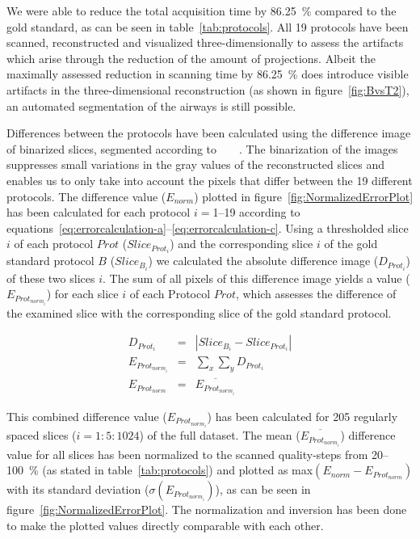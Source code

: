 We were able to reduce the total acquisition time by \SI{86.25}{\percent} compared to the gold standard, as can be seen in table~\ref{tab:protocols}. All 19 protocols have been scanned, reconstructed and visualized three-dimensionally to assess the artifacts which arise through the reduction of the amount of projections. Albeit the maximally assessed reduction in scanning time by \SI{86.25}{\percent} does introduce visible artifacts in the three-dimensional reconstruction (as shown in figure~\ref{fig:BvsT2}), an automated segmentation of the airways is still possible.

Differences between the protocols have been calculated using the difference image of binarized slices, segmented according to%
\ifhtml
	~\citet{Otsu1979}
\else
	~
\fi%
. The binarization of the images suppresses small variations in the gray values of the reconstructed slices and enables us to only take into account the pixels that differ between the 19 different protocols. The difference value ($E_{norm}$) plotted in figure~\ref{fig:NormalizedErrorPlot} has been calculated for each protocol $i=$1--19 according to equations~\ref{eq:errorcalculation-a}--\ref{eq:errorcalculation-c}. Using a thresholded slice $i$ of each protocol $Prot$ ($Slice_{Prot_{i}}$) and the corresponding slice $i$ of the gold standard protocol $B$ ($Slice_{B_{i}}$) we calculated the absolute difference image ($D_{Prot_{i}}$) of these two slices $i$. The sum of all pixels of this difference image yields a value ($E_{Prot_{norm_{i}}}$) for each slice $i$ of each Protocol $Prot$, which assesses the difference of the examined slice with the corresponding slice of the gold standard protocol. 

\begin{eqnarray}%
	D_{Prot_{i}} &=& |Slice_{B_{i}}-Slice_{Prot_{i}}|\label{eq:errorcalculation-a}\\%
	E_{Prot_{norm_{i}}} &=& \sum_{x}\sum_{y} D_{Prot_{i}}\label{eq:errorcalculation-b}\\%
    E_{Prot_{norm}} &=& \overline{E_{Prot_{norm_{i}}}}\label{eq:errorcalculation-c}%
\end{eqnarray}%

This combined difference value ($E_{Prot_{norm_{i}}}$) has been calculated for 205 regularly spaced slices ($i=1:5:1024$) of the full dataset. The mean ($\overline{E_{Prot_{norm_{i}}}}$) difference value for all slices has been normalized to the scanned quality-steps from 20--\SI{100}{\percent} (as stated in table~\ref{tab:protocols}) and plotted as max$(E_{norm}-E_{Prot_{norm}})$ with its standard deviation ($\sigma(E_{Prot_{norm_{i}}})$), as can be seen in figure~\ref{fig:NormalizedErrorPlot}. The normalization and inversion has been done to make the plotted values directly comparable with each other.

